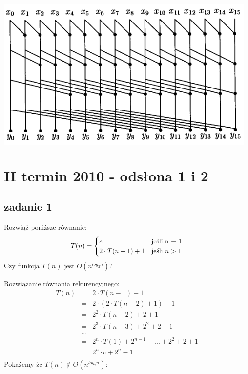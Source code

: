 \documentclass[svgnames]{report}
\begin{document}
\includegraphics{images/27.png}


\chapter{II termin 2010 - odsłona 1 i 2 }

\section{zadanie 1}
\begin{framed}
Rozwiąż poniższe równanie:
\begin{equation*}
T(n) = 
	\begin{cases}
		c 					&	\hbox{jeśli n = 1}		\\
		2 \cdot T(n-1) + 1 	&	\hbox{jeśli $n > 1$}	\\
	\end{cases}
\end{equation*}
Czy funkcja $T(n)$ jest $O(n^{log_2 n})$?

\end{framed}

Rozwiązanie równania rekurencyjnego:
\begin{eqnarray*}
T(n) 	&=& 2 \cdot T(n-1) + 1	\\
		&=&	2 \cdot ( 2\cdot T(n-2) + 1 ) + 1	\\
		&=& 2^2 \cdot T(n-2) + 2 + 1	\\
		&=&	2^3 \cdot T(n-3) + 2^2 + 2 + 1 \\
		&...&	\\
		&=&	2^n\cdot T(1) + 2^{n-1} + ... + 2^2 + 2 + 1 \\
		&=& 2^n \cdot c + 2^n - 1	\\
\end{eqnarray*}
Pokażemy że $T(n) \not\in O(n^{log_2 n})$:
\end{document}

